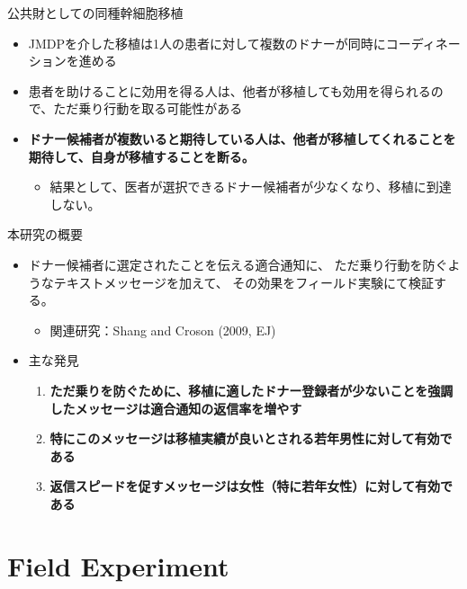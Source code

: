 \documentclass[
      aspectratio=169,
        12pt,
    ]{beamer}
\renewcommand{\textbf}[1]{{\color{DarkBlue}\bfseries#1}}
\providecommand{\tightlist}{%
  \setlength{\itemsep}{0pt}\setlength{\parskip}{0pt}}
\begin{document}
\begin{frame}{公共財としての同種幹細胞移植}
\protect\hypertarget{ux516cux5171ux8ca1ux3068ux3057ux3066ux306eux540cux7a2eux5e79ux7d30ux80deux79fbux690d}{}
\begin{itemize}
\tightlist
\item
  JMDPを介した移植は1人の患者に対して複数のドナーが同時にコーディネーションを進める
\item
  患者を助けることに効用を得る人は、他者が移植しても効用を得られるので、ただ乗り行動を取る可能性がある
\item
  \textbf{ドナー候補者が複数いると期待している人は、他者が移植してくれることを期待して、自身が移植することを断る。}

  \begin{itemize}
  \tightlist
  \item
    結果として、医者が選択できるドナー候補者が少なくなり、移植に到達しない。
  \end{itemize}
\end{itemize}
\end{frame}

\begin{frame}{本研究の概要}
\protect\hypertarget{ux672cux7814ux7a76ux306eux6982ux8981}{}
\begin{itemize}
\tightlist
\item
  ドナー候補者に選定されたことを伝える適合通知に、
  ただ乗り行動を防ぐようなテキストメッセージを加えて、
  その効果をフィールド実験にて検証する。

  \begin{itemize}
  \tightlist
  \item
    関連研究：Shang and Croson (2009, EJ)
  \end{itemize}
\item
  主な発見

  \begin{enumerate}
  \tightlist
  \item
    \textbf{ただ乗りを防ぐために、移植に適したドナー登録者が少ないことを強調したメッセージは適合通知の返信率を増やす}
  \item
    \textbf{特にこのメッセージは移植実績が良いとされる若年男性に対して有効である}
  \item
    \textbf{返信スピードを促すメッセージは女性（特に若年女性）に対して有効である}
  \end{enumerate}
\end{itemize}
\end{frame}

\hypertarget{field-experiment}{%
\section{Field Experiment}\label{field-experiment}}
\end{document}
